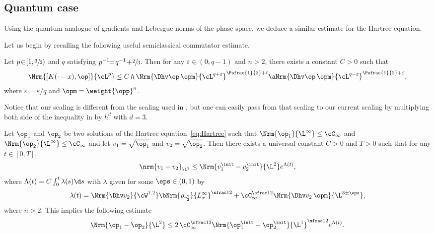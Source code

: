 \subsection{Quantum case}\label{sect:Qcase}

Using the quantum analogue of gradients and Lebesgue norms of the phase space, we deduce a similar estimate for the Hartree equation.

Let us begin by recalling the following useful semiclassical commutator estimate.
\begin{lem}\label{lem:semiclassical_commutator_est}
Let $p \!\in\! [1, \sfrac{3}{2})$ and $q$ satisfying \hbox{$p^{-1}\!\!=\!q^{-1}\!+\!\sfrac23$}. Then for any $\varepsilon \in (0, q-1)$ and $n>2$, there exists a constant $C>0$ such that
\begin{align*}
\Nrm{[K(\cdot-x), \op]}{\cL^p} \le C\, h\, \Nrm{\Dhv \op\, \opm}{\cL^{q+\varepsilon}}^{\Psfrac{1}{2}+\tilde \epsilon}\aNrm{\Dhv \op\, \opm}{\cL^{q-\varepsilon}}^{\Psfrac{1}{2}+\tilde \varepsilon},
\end{align*}
where $\tilde \varepsilon = \varepsilon/q$ and $\opm=\weight{\opp}^n$.
\end{lem}
Notice that our scaling is different from the scaling used in \cite[Prop.\,4.3]{lafleche_strong_2021}, but one can easily pass from that scaling to our current scaling by multiplying both side of the inequality in \cite{lafleche_strong_2021} by $h^d$ with $d=3$.
\begin{theorem}\label{thm:Q-uniqueness}
Let $\op_1$ and $\op_2$ be two solutions of the Hartree equation~\eqref{eq:Hartree} such that $\Nrm{\op_1}{\L^\infty} \leq \cC_{\infty}$ and $\Nrm{\op_2}{\L^\infty} \leq \cC_{\infty}$ and let $v_1 = \sqrt{\op_1}$ and $v_2 = \sqrt{\op_2}$. Then there exists a universal constant $C>0$ and $T>0$ such that for any $t\in [0,T]$,
\begin{equation}\label{eq:L^2-L^2}
\nrm{v_1-v_2}_{\L^2} \leq {\Nrm{v_1^\init-v_2^\init}{\L^2} e^{\Lambda(t)}},
\end{equation}
where $\Lambda(t) = C \int_0^t \lambda(s)\d s$ with $\lambda$ given for some $\eps\in(0,1)$ by
\begin{equation}\label{eq:lambda_2}
\lambda(t) = \Nrm{\Dhv v_2}{\cW^{1,2}} \bNrm{{\rho_{v_2^2}}}{L^\infty_x}^{\sfrac12} + \cC_{\infty}^{\sfrac12} {\Nrm{\Dhv v_2\,\opm}{\L^{3\pm\eps}}},
\end{equation}
{where $n>2$}. This implies the following estimate
\begin{equation}\label{eq:L^2-L^1}
\Nrm{\op_1-\op_2}{\L^2} \leq 2\, \cC_{\infty}^{\sfrac12} \Nrm{\op_1^\init-\op_2^\init}{\L^1}^{\sfrac12} e^{\Lambda(t)}.
\end{equation}
\end{theorem}

